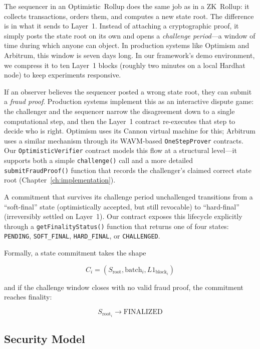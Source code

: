 The sequencer in an Optimistic~Rollup does the same job as in a ZK~Rollup: it collects transactions, orders them, and computes a new state root. The difference is in what it sends to Layer~1. Instead of attaching a cryptographic proof, it simply posts the state root on its own and opens a \textit{challenge period}---a window of time during which anyone can object. In production systems like Optimism and Arbitrum, this window is seven days long. In our framework's demo environment, we compress it to ten Layer~1 blocks (roughly two minutes on a local Hardhat node) to keep experiments responsive.

If an observer believes the sequencer posted a wrong state root, they can submit a \textit{fraud proof}. Production systems implement this as an interactive dispute game: the challenger and the sequencer narrow the disagreement down to a single computational step, and then the Layer~1 contract re-executes that step to decide who is right. Optimism uses its Cannon virtual machine for this; Arbitrum uses a similar mechanism through its WAVM-based \texttt{OneStepProver} contracts. Our \texttt{OptimisticVerifier} contract models this flow at a structural level---it supports both a simple \texttt{challenge()} call and a more detailed \texttt{submitFraudProof()} function that records the challenger's claimed correct state root (Chapter~\ref{ch:implementation}).

A commitment that survives its challenge period unchallenged transitions from a ``soft-final'' state (optimistically accepted, but still revocable) to ``hard-final'' (irreversibly settled on Layer~1). Our contract exposes this lifecycle explicitly through a \texttt{getFinalityStatus()} function that returns one of four states: \texttt{PENDING}, \texttt{SOFT\_FINAL}, \texttt{HARD\_FINAL}, or \texttt{CHALLENGED}.

Formally, a state commitment takes the shape

\begin{equation}
C_i = (S_{\text{root}}, \text{batch}_i, L1_{\text{block}_i})
\end{equation}

\noindent and if the challenge window closes with no valid fraud proof, the commitment reaches finality:

\begin{equation}
S_{\text{root}_i} \rightarrow \text{FINALIZED}
\end{equation}

\subsection{Security Model}

